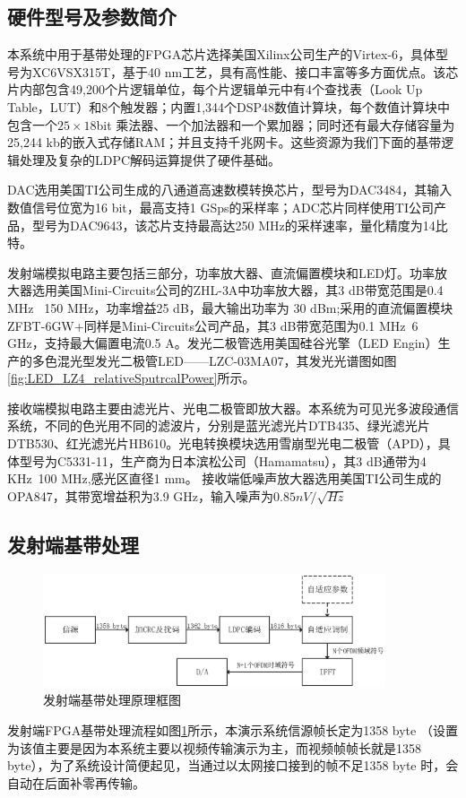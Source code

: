 \subsection{硬件型号及参数简介}
本系统中用于基带处理的FPGA芯片选择美国Xilinx公司生产的Virtex-6，具体型号为XC6VSX315T，基于40 nm工艺，具有高性能、接口丰富等多方面优点。该芯片内部包含49,200个片逻辑单位，每个片逻辑单元中有4个查找表（Look Up Table，LUT）和8个触发器；内置1,344个DSP48数值计算块，每个数值计算块中包含一个$25\times 18$bit 乘法器、一个加法器和一个累加器；同时还有最大存储容量为25,244 kb的嵌入式存储RAM；并且支持千兆网卡\cite{FPGAIntroduciton}。这些资源为我们下面的基带逻辑处理及复杂的LDPC解码运算提供了硬件基础。

DAC选用美国TI公司生成的八通道高速数模转换芯片，型号为DAC3484，其输入数值信号位宽为16 bit，最高支持1 GSps的采样率；ADC芯片同样使用TI公司产品，型号为DAC9643，该芯片支持最高达250 MHz的采样速率，量化精度为14比特。

发射端模拟电路主要包括三部分，功率放大器、直流偏置模块和LED灯。功率放大器选用美国Mini-Circuits公司的ZHL-3A中功率放大器，其3 dB带宽范围是0.4 MHz ~150 MHz，功率增益25 dB，最大输出功率为 30 dBm;采用的直流偏置模块ZFBT-6GW+同样是Mini-Circuits公司产品，其3 dB带宽范围为0.1 MHz~6 GHz，支持最大偏置电流0.5 A。发光二极管选用美国硅谷光擎（LED Engin）生产的多色混光型发光二极管LED——LZC-03MA07，其发光光谱图如图\ref{fig:LED_LZ4_relativeSputrcalPower}所示。

接收端模拟电路主要由滤光片、光电二极管即放大器。本系统为可见光多波段通信系统，不同的色光用不同的滤波片，分别是蓝光滤光片DTB435、绿光滤光片DTB530、红光滤光片HB610。光电转换模块选用雪崩型光电二极管（APD），具体型号为C5331-11，生产商为日本滨松公司（Hamamatsu），其3 dB通带为4 KHz~100 MHz,感光区直径1 mm。 接收端低噪声放大器选用美国TI公司生成的OPA847，其带宽增益积为3.9 GHz，输入噪声为$0.85 nV/\sqrt{Hz}$
\subsection{发射端基带处理}
\begin{figure}[htbp]
\centering
\includegraphics[width=0.9\textwidth]{figures/chapter-5/TransmitterSchematic.eps}
\caption{发射端基带处理原理框图}
\label{fig:TransmitterSchematic}
\end{figure}
发射端FPGA基带处理流程如图\ref{fig:TransmitterSchematic}所示，本演示系统信源帧长定为1358 byte （设置为该值主要是因为本系统主要以视频传输演示为主，而视频帧帧长就是1358 byte），为了系统设计简便起见，当通过以太网接口接到的帧不足1358 byte 时，会自动在后面补零再传输。

